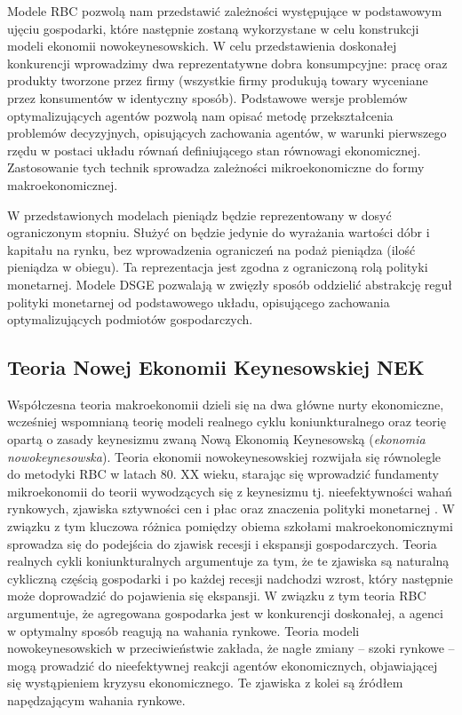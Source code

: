 Modele RBC pozwolą nam przedstawić zależności występujące w podstawowym ujęciu gospodarki, które następnie zostaną wykorzystane w celu konstrukcji modeli ekonomii nowokeynesowskich. W celu przedstawienia doskonałej konkurencji wprowadzimy dwa reprezentatywne dobra konsumpcyjne: pracę oraz produkty tworzone przez firmy (wszystkie firmy produkują towary wyceniane przez konsumentów w identyczny sposób). Podstawowe wersje problemów optymalizujących agentów pozwolą nam opisać metodę przekształcenia problemów decyzyjnych, opisujących zachowania agentów, w warunki pierwszego rzędu w postaci układu równań definiującego stan równowagi ekonomicznej. Zastosowanie tych technik sprowadza zależności mikroekonomiczne do formy makroekonomicznej.

W przedstawionych modelach pieniądz będzie reprezentowany w dosyć ograniczonym stopniu. Służyć on będzie jedynie do wyrażania wartości dóbr i kapitału na rynku, bez wprowadzenia ograniczeń na podaż pieniądza (ilość pieniądza w obiegu). Ta reprezentacja jest zgodna z ograniczoną rolą polityki monetarnej. Modele DSGE pozwalają w zwięzły sposób oddzielić abstrakcję reguł polityki monetarnej od podstawowego układu, opisującego zachowania optymalizujących podmiotów gospodarczych.

\subsection{Teoria Nowej Ekonomii Keynesowskiej NEK}

Współczesna teoria makroekonomii dzieli się na dwa główne nurty ekonomiczne, wcześniej wspomnianą teorię modeli realnego cyklu koniunkturalnego oraz teorię opartą o zasady keynesizmu zwaną Nową Ekonomią Keynesowską (\emph{ekonomia nowokeynesowska})\cite{costaBook}. Teoria ekonomii nowokeynesowskiej rozwijała się równolegle do metodyki RBC w latach 80. XX wieku, starając się wprowadzić fundamenty mikroekonomii do teorii wywodzących się z keynesizmu tj. nieefektywności wahań rynkowych, zjawiska sztywności cen i płac oraz znaczenia polityki monetarnej \cite{gali_gertler}. W związku z tym kluczowa różnica pomiędzy obiema szkołami makroekonomicznymi sprowadza się do podejścia do zjawisk recesji i ekspansji gospodarczych. Teoria realnych cykli koniunkturalnych argumentuje za tym, że te zjawiska są naturalną cykliczną częścią gospodarki i po każdej recesji nadchodzi wzrost, który następnie może doprowadzić do pojawienia się ekspansji. W związku z tym teoria RBC argumentuje, że agregowana gospodarka jest w konkurencji doskonałej, a agenci w optymalny sposób reagują na wahania rynkowe. Teoria modeli nowokeynesowskich w przeciwieństwie zakłada, że nagłe zmiany -- szoki rynkowe -- mogą prowadzić do nieefektywnej reakcji agentów ekonomicznych, objawiającej się wystąpieniem kryzysu ekonomicznego. Te zjawiska z kolei są źródłem napędzającym wahania rynkowe.


